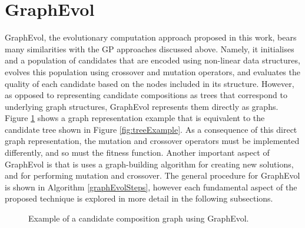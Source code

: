 \documentclass{article}
\begin{document}
\section{GraphEvol}\label{graphevol}
GraphEvol, the evolutionary computation approach proposed in this work, bears many similarities with the GP approaches discussed above. Namely, it initialises and a population 
of candidates that are encoded using non-linear data structures, evolves this population using crossover and mutation operators, and evaluates the quality of each candidate
based on the nodes included in its structure. However, as opposed to representing candidate compositions as trees that correspond to underlying graph structures, GraphEvol
represents them directly as graphs. Figure \ref{fig:graphExample} shows a graph representation example that is equivalent to the candidate tree shown in Figure \ref{fig:treeExample}. As a consequence of this direct graph representation, the mutation and crossover operators must be implemented differently, and so must the fitness function. Another important aspect of GraphEvol is that is uses a graph-building algorithm for creating new  solutions, and for performing mutation and crossover. The general procedure for GraphEvol is shown in Algorithm \ref{graphEvolSteps}, however each fundamental aspect of the proposed technique is explored in more detail in the following subsections.

\begin{figure}
\centerline{
}
\caption{Example of a candidate composition graph using GraphEvol.}
\label{fig:graphExample}
\end{figure}
\end{document}
